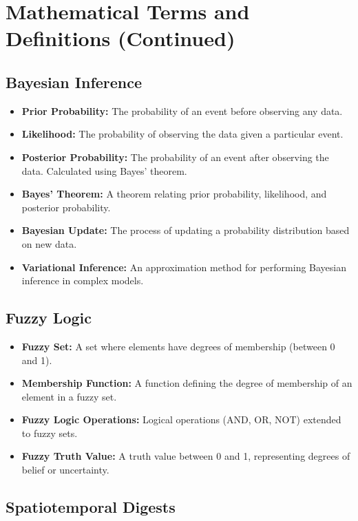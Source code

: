 \documentclass[12pt, a4paper]{article}
\begin{document}
 
\section{Mathematical Terms and Definitions (Continued)}

\subsection{Bayesian Inference}

\begin{itemize}
    \item \textbf{Prior Probability:} The probability of an event before observing any data.
    \item \textbf{Likelihood:} The probability of observing the data given a particular event.
    \item \textbf{Posterior Probability:} The probability of an event after observing the data.  Calculated using Bayes' theorem.
    \item \textbf{Bayes' Theorem:} A theorem relating prior probability, likelihood, and posterior probability.
    \item \textbf{Bayesian Update:} The process of updating a probability distribution based on new data.
    \item \textbf{Variational Inference:} An approximation method for performing Bayesian inference in complex models.
\end{itemize}

\subsection{Fuzzy Logic}

\begin{itemize}
    \item \textbf{Fuzzy Set:} A set where elements have degrees of membership (between 0 and 1).
    \item \textbf{Membership Function:} A function defining the degree of membership of an element in a fuzzy set.
    \item \textbf{Fuzzy Logic Operations:}  Logical operations (AND, OR, NOT) extended to fuzzy sets.
    \item \textbf{Fuzzy Truth Value:} A truth value between 0 and 1, representing degrees of belief or uncertainty.
\end{itemize}


\subsection{Spatiotemporal Digests}
\end{document}
